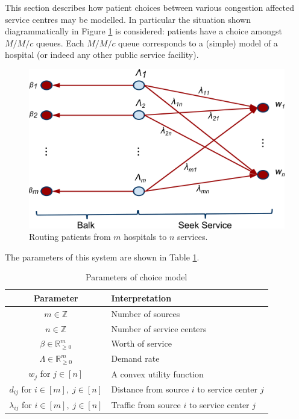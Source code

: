 \documentclass[a4paper,11pt]{article}
\begin{document}
This section describes how patient choices between various congestion affected service centres may be modelled.
In particular the situation shown diagrammatically in Figure \ref{fig:choices} is considered: patients have a choice amongst $M/M/c$ queues.
Each $M/M/c$ queue corresponds to a (simple) model of a hospital (or indeed any other public service facility).

\begin{figure}[!hbtp]
\begin{center}
\includegraphics[width=.7\textwidth]{./Images/Hospital_Choices.pdf}
\end{center}
\caption{Routing patients from $m$ hospitals to $n$ services.}\label{fig:choices}
\end{figure}

The parameters of this system are shown in Table \ref{tab:parameters}.

\begin{table}[!hbtp]
\begin{center}
\begin{tabular}{cl}
\toprule
Parameter & Interpretation\\
\midrule
$m\in\mathbb{Z}$& Number of sources\\
$n\in\mathbb{Z}$& Number of service centers\\
$\beta\in\mathbb{R}_{\geq 0}^{m}$& Worth of service\\
$\Lambda\in\mathbb{R}_{\geq 0}^{m}$& Demand rate\\
$w_j$ for $j\in[n]$& A convex utility function\\
$d_{ij}$ for $i\in[m],\;j\in[n]$& Distance from source $i$ to service center $j$\\
$\lambda_{ij}$ for $i\in[m],\;j\in[n]$& Traffic from source $i$ to service center $j$\\
\toprule
\end{tabular}
\caption{Parameters of choice model}\label{tab:parameters}
\end{center}
\end{table}
\end{document}
